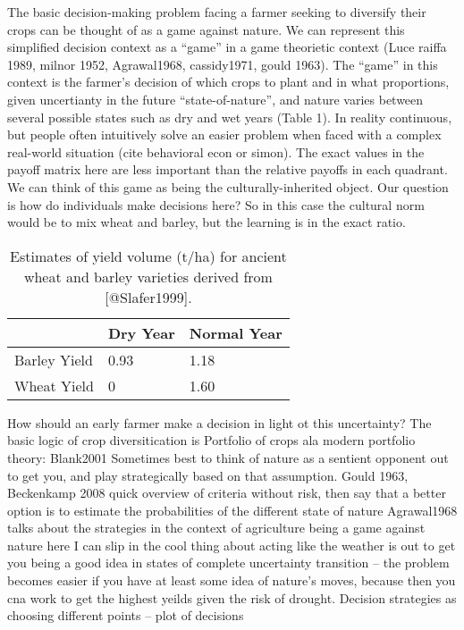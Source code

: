 \documentclass[smallextended]{svjour3}       %
\begin{document}
The basic decision-making problem facing a farmer seeking to diversify
their crops can be thought of as a game against nature. We can represent
this simplified decision context as a ``game'' in a game theorietic
context (Luce raiffa 1989, milnor 1952, Agrawal1968, cassidy1971, gould
1963). The ``game'' in this context is the farmer's decision of which
crops to plant and in what proportions, given uncertianty in the future
``state-of-nature'', and nature varies between several possible states
such as dry and wet years (Table 1). In reality continuous, but people
often intuitively solve an easier problem when faced with a complex
real-world situation (cite behavioral econ or simon). The exact values
in the payoff matrix here are less important than the relative payoffs
in each quadrant. We can think of this game as being the
culturally-inherited object. Our question is how do individuals make
decisions here? So in this case the cultural norm would be to mix wheat
and barley, but the learning is in the exact ratio.

\begin{table}
\centering
\caption{Estimates of yield volume (t/ha) for ancient wheat and barley varieties derived from [@Slafer1999].}
\begin{tabular}{|l|l|l|}
\hline

 & Dry Year & Normal Year \\ \hline
Barley Yield & 0.93 & 1.18 \\ \hline
Wheat Yield & 0 & 1.60 \\ \hline

\end{tabular}
\end{table}

How should an early farmer make a decision in light ot this uncertainty?
The basic logic of crop diversitication is Portfolio of crops ala modern
portfolio theory: Blank2001 Sometimes best to think of nature as a
sentient opponent out to get you, and play strategically based on that
assumption. Gould 1963, Beckenkamp 2008 quick overview of criteria
without risk, then say that a better option is to estimate the
probabilities of the different state of nature Agrawal1968 talks about
the strategies in the context of agriculture being a game against nature
here I can slip in the cool thing about acting like the weather is out
to get you being a good idea in states of complete uncertainty
transition -- the problem becomes easier if you have at least some idea
of nature's moves, because then you cna work to get the highest yeilds
given the risk of drought. Decision strategies as choosing different
points -- plot of decisions
\end{document}

